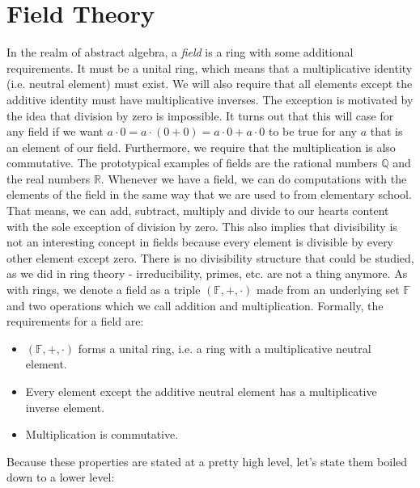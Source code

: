 \section{Field Theory}
In the realm of abstract algebra, a \emph{field} is a ring with some additional requirements. It must be a unital ring, which means that a multiplicative identity (i.e. neutral element) must exist. We will also require that all elements except the additive identity must have multiplicative inverses. The exception is motivated by the idea that division by zero is impossible. It turns out that this will case for any field if we want $a \cdot 0 = a \cdot (0 + 0) = a \cdot 0 + a \cdot 0$ to be true for any $a$ that is an element of our field. Furthermore, we require that the multiplication is also commutative. The prototypical examples of fields are the rational numbers $\mathbb{Q}$ and the real numbers $\mathbb{R}$. Whenever we have a field, we can do computations with the elements of the field in the same way that we are used to from elementary school. That means, we can add, subtract, multiply and divide to our hearts content with the sole exception of division by zero. This also implies that divisibility is not an interesting concept in fields because every element is divisible by every other element except zero. There is no divisibility structure that could be studied, as we did in ring theory - irreducibility, primes, etc. are not a thing anymore. As with rings, we denote a field as a triple $(\mathbb{F}, +, \cdot)$ made from an underlying set $\mathbb{F}$ and two operations which we call addition and multiplication. Formally, the requirements for a field are:
\begin{itemize}
\item $(\mathbb{F},+,\cdot)$ forms a unital ring, i.e. a ring with a multiplicative neutral element.
\item Every element except the additive neutral element has a multiplicative inverse element.
\item Multiplication is commutative.
\end{itemize}
Because these properties are stated at a pretty high level, let's state them boiled down to a lower level:

